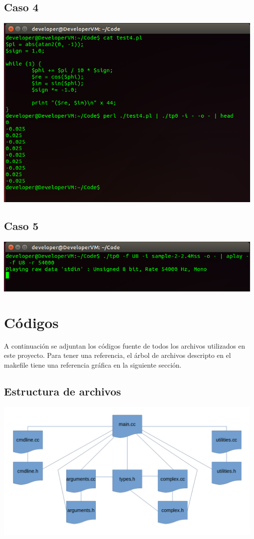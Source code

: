 \documentclass[10pt,a4paper]{article}
\begin{document}
\subsection{Caso 4}
\begin{center}
\includegraphics[scale=0.4]{Imagenes/Caso4.png} 
\end{center}
\subsection{Caso 5}
\begin{center}
\includegraphics[scale=0.4]{Imagenes/Caso5.png} 
\end{center}
\section{Códigos}
A continuación se adjuntan los códigos fuente de todos los archivos utilizados en este proyecto. Para tener una referencia, el árbol de archivos descripto en el makefile tiene una referencia gráfica en la siguiente sección.\\
\subsection{Estructura de archivos}
\begin{center}
\includegraphics[scale=0.25]{Imagenes/Jerarquia_de_archivos.png} 
\end{center}
\end{document}
